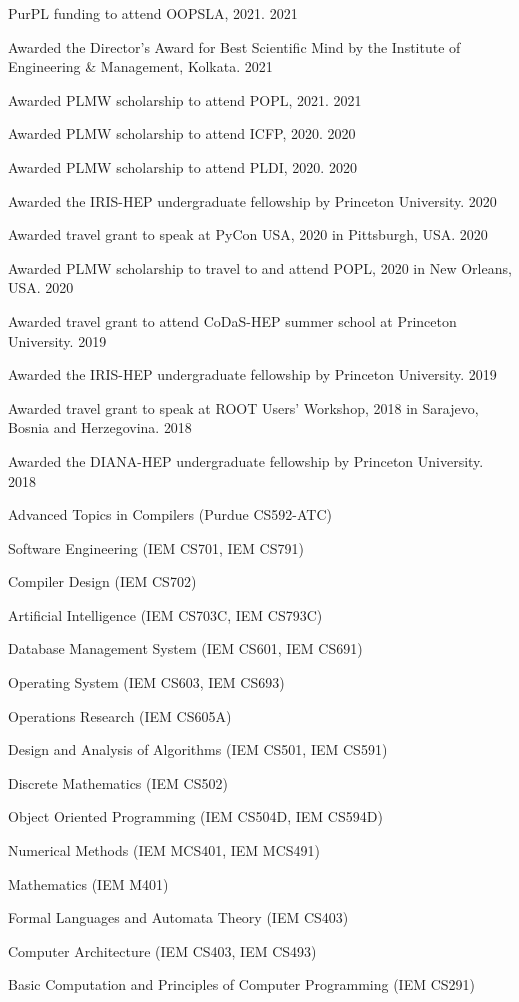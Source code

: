 \documentclass[10pt, letterpaper]{fulldeps}
\begin{document}
%
%
\begin{tightitemize}
    \item PurPL funding to attend OOPSLA, 2021. \hfill{2021}
    \item Awarded the Director's Award for Best Scientific Mind by the Institute of Engineering \& Management, Kolkata. \hfill{2021}
    \item Awarded PLMW scholarship to attend POPL, 2021. \hfill{2021}
    \item Awarded PLMW scholarship to attend ICFP, 2020. \hfill{2020}
    \item Awarded PLMW scholarship to attend PLDI, 2020. \hfill{2020}
    \item Awarded the IRIS-HEP undergraduate fellowship by Princeton University. \hfill{2020}
    \item Awarded travel grant to speak at PyCon USA, 2020 in Pittsburgh, USA. \hfill{2020}
    \item Awarded PLMW scholarship to travel to and attend POPL, 2020 in New Orleans, USA. \hfill{2020}
    \item Awarded travel grant to attend CoDaS-HEP summer school at Princeton University. \hfill{2019}
    \item Awarded the IRIS-HEP undergraduate fellowship by Princeton University. \hfill{2019}
    \item Awarded travel grant to speak at ROOT Users' Workshop, 2018 in Sarajevo, Bosnia and Herzegovina. \hfill{2018}
	\item Awarded the DIANA-HEP undergraduate fellowship by Princeton University. \hfill{2018}
\end{tightitemize}

\begin{tightitemize}
\item Advanced Topics in Compilers (Purdue CS592-ATC)
\item Software Engineering (IEM CS701, IEM CS791)
\item Compiler Design (IEM CS702)
\item Artificial Intelligence (IEM CS703C, IEM CS793C)
\item Database Management System (IEM CS601, IEM CS691)
\item Operating System (IEM CS603, IEM CS693)
\item Operations Research (IEM CS605A)
\item Design and Analysis of Algorithms (IEM CS501, IEM CS591)
\item Discrete Mathematics (IEM CS502)
\item Object Oriented Programming (IEM CS504D, IEM CS594D)
\item Numerical Methods (IEM MCS401, IEM MCS491)
\item Mathematics (IEM M401)
\item Formal Languages and Automata Theory (IEM CS403)
\item Computer Architecture (IEM CS403, IEM CS493)
\item Basic Computation and Principles of Computer Programming (IEM CS291)
\end{tightitemize}
\end{document}
